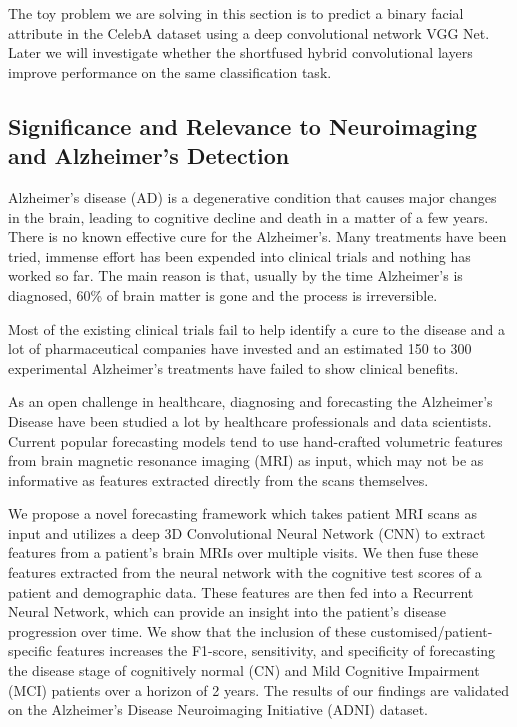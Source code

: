 \documentclass[12pt]{article}
\begin{document}
The toy problem we are solving in this section is to predict a binary facial attribute in the CelebA dataset using a deep convolutional network VGG Net. Later we will investigate whether the shortfused hybrid convolutional layers improve performance on the same classification task.

\subsection{Significance and Relevance to Neuroimaging and Alzheimer's Detection}

Alzheimer’s disease (AD)  is a degenerative condition that causes major changes in the brain, leading to cognitive decline and death in a matter of a few years. There is no known effective cure for the Alzheimer's. Many treatments have been tried, immense effort has been expended into clinical trials and nothing has worked so far. The main reason is that, usually by the time Alzheimer's is diagnosed, 60\% of brain matter is gone and the process is irreversible.

Most of the existing clinical trials fail to help identify a cure to the disease and a lot of pharmaceutical companies have invested and an estimated 150 to 300 experimental Alzheimer's treatments have failed to show clinical benefits. 

As an open challenge in healthcare, diagnosing and forecasting the Alzheimer's Disease have been studied a lot by healthcare professionals and data scientists. Current popular forecasting models tend to use hand-crafted volumetric features from brain magnetic resonance imaging (MRI) as input, which may not be as informative as features extracted directly from the scans themselves. 

We propose a novel forecasting framework which takes patient MRI scans as input and utilizes a deep 3D Convolutional Neural Network (CNN) to extract features from a patient’s brain MRIs over multiple visits. We then fuse these features extracted from the neural network with the cognitive test scores of a patient and demographic data. These features are then fed into a Recurrent Neural Network, which can provide an insight into the patient’s disease progression over time. We show that the inclusion of these customised/patient-specific features increases the F1-score, sensitivity, and specificity of forecasting the disease stage of cognitively normal (CN) and Mild Cognitive Impairment (MCI) patients over a horizon of 2 years. The results of our findings are validated on the Alzheimer’s Disease Neuroimaging Initiative (ADNI) dataset.
\end{document}
